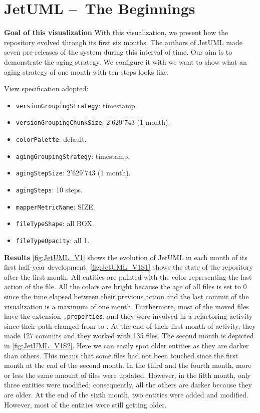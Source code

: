 \clearpage
\section{JetUML – The Beginnings}
\textbf{Goal of this visualization}
With this visualization, we present how the repository evolved through its first six months. 
The authors of JetUML made seven pre-releases of the system during this interval of time.
Our aim is to demonstrate the aging strategy. We configure it with we want to show what an aging strategy of one month with ten steps looks like. 


View specification adopted: 
\begin{itemize}
    \item \texttt{versionGroupingStrategy}: timestamp.
    \item \texttt{versionGroupingChunkSize}: 2'629'743 (1 month). 
    \item \texttt{colorPalette}: default.
    \item \texttt{agingGroupingStrategy}: timestamp.
    \item \texttt{agingStepSize}: 2'629'743 (1 month).
    \item \texttt{agingSteps}: 10 steps.
    \item \texttt{mapperMetricName}: SIZE. 
    \item \texttt{fileTypeShape}: all BOX. 
    \item \texttt{fileTypeOpacity}: all 1. 
\end{itemize}

\textbf{Results}
\autoref{fig:JetUML_V1} shows the evolution of JetUML in each month of its first half-year development. \autoref{fig:JetUML_V1S1} shows the state of the repository after the first month. All entities are painted with the color representing the last action of the file. All the colors are bright because the age of all files is set to 0 since the time elapsed between their previous action and the last commit of the visualization is a maximum of one month. Furthermore, most of the moved files have the extension \texttt{.properties}, and they were involved in a refactoring activity since their path changed from  to .  At the end of their first month of activity, they made 127 commits and they worked with 135 files. The second month is depicted in \autoref{fig:JetUML_V1S2}. Here we can easily spot older entities as they are darker than others. This means that some files had not been touched since the first month at the end of the second month. In the third and the fourth month, more or less the same amount of files were updated. However, in the fifth month, only three entities were modified; consequently, all the others are darker because they are older. 
At the end of the sixth month, two entities were added and modified. However, most of the entities were still getting older. 

